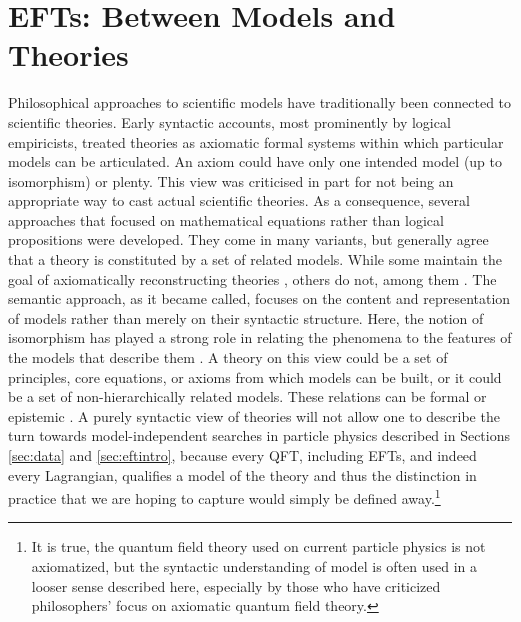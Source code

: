 \section{EFTs: Between Models and Theories} 		%
\label{sec:models} 

Philosophical approaches to scientific models have traditionally been connected to scientific theories. 
Early syntactic accounts, most prominently by logical empiricists, treated theories as axiomatic formal systems \citep[such as][]{carnap59,hempel66}
within which particular models can be articulated. 
An axiom could have only one intended model (up to isomorphism) or plenty. 
This view was criticised in part for not being an appropriate way to cast actual scientific theories. 
As a consequence, several approaches that focused on mathematical equations rather than logical propositions were developed.
They come in many variants, but generally agree that a theory is constituted by a set of related models. 
While some maintain the goal of axiomatically reconstructing theories \citep[among them][]{suppes60}, others do not, among them \citep{giere88}.
The semantic approach, as it became called, focuses on the content and representation of models rather than merely on their syntactic structure.
Here, the notion of isomorphism has played a strong role in relating the phenomena to the features of the models that describe them \citep{vf80}. 
A theory on this view could be a set of principles, core equations, or axioms from which models can be built, or it could be a set of non-hierarchically related models. These relations can be formal \citep{suppes60} or epistemic \citep{giere88}.
A purely syntactic view of theories will not allow one to describe the turn towards model-independent searches in particle physics described in Sections \ref{sec:data} and \ref{sec:eftintro}, because every QFT, including EFTs, and indeed every Lagrangian, qualifies a model of the theory and thus the distinction in practice that we are hoping to capture would simply be defined away.\footnote{It is true, the quantum field theory used on current particle physics is not axiomatized, but the syntactic understanding of model is often used in a looser sense described here, especially by those who have criticized philosophers' focus on axiomatic quantum field theory.}

